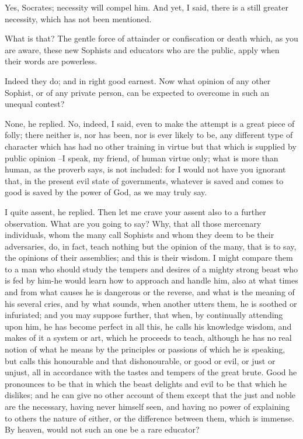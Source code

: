 Yes, Socrates; necessity will compel him.
And yet, I said, there is a still greater necessity, which has not been mentioned.

What is that?
The gentle force of attainder or confiscation or death which, as you are aware, these new Sophists and educators who are the public, apply when their words are powerless.

Indeed they do; and in right good earnest.
Now what opinion of any other Sophist, or of any private person, can be expected to overcome in such an unequal contest?

None, he replied.
No, indeed, I said, even to make the attempt is a great piece of folly; there neither is, nor has been, nor is ever likely to be, any different type of character which has had no other training in virtue but that which is supplied by public opinion --I speak, my friend, of human virtue only; what is more than human, as the proverb says, is not included: for I would not have you ignorant that, in the present evil state of governments, whatever is saved and comes to good is saved by the power of God, as we may truly say.

I quite assent, he replied.
Then let me crave your assent also to a further observation.
What are you going to say?
Why, that all those mercenary individuals, whom the many call Sophists and whom they deem to be their adversaries, do, in fact, teach nothing but the opinion of the many, that is to say, the opinions of their assemblies; and this is their wisdom. I might compare them to a man who should study the tempers and desires of a mighty strong beast who is fed by him-he would learn how to approach and handle him, also at what times and from what causes he is dangerous or the reverse, and what is the meaning of his several cries, and by what sounds, when another utters them, he is soothed or infuriated; and you may suppose further, that when, by continually attending upon him, he has become perfect in all this, he calls his knowledge wisdom, and makes of it a system or art, which he proceeds to teach, although he has no real notion of what he means by the principles or passions of which he is speaking, but calls this honourable and that dishonourable, or good or evil, or just or unjust, all in accordance with the tastes and tempers of the great brute. Good he pronounces to be that in which the beast delights and evil to be that which he dislikes; and he can give no other account of them except that the just and noble are the necessary, having never himself seen, and having no power of explaining to others the nature of either, or the difference between them, which is immense. By heaven, would not such an one be a rare educator?

